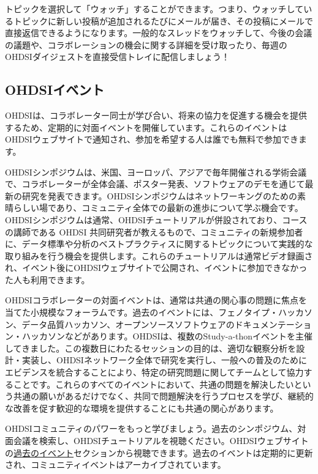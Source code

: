 \documentclass[
  11pt]{book}
\makeatletter
\newenvironment{kframe}{%
\medskip{}
\setlength{\fboxsep}{.8em}
 \def\at@end@of@kframe{}%
 \ifinner\ifhmode%
  \def\at@end@of@kframe{\end{minipage}}%
  \begin{minipage}{\columnwidth}%
 \fi\fi%
 \def\FrameCommand##1{\hskip\@totalleftmargin \hskip-\fboxsep
 \colorbox{myShadeColor}{##1}\hskip-\fboxsep
     \hskip-\linewidth \hskip-\@totalleftmargin \hskip\columnwidth}%
 \MakeFramed {\advance\hsize-\width
   \@totalleftmargin\z@ \linewidth\hsize
   \@setminipage}}%
 {\par\unskip\endMakeFramed%
 \at@end@of@kframe}
\newenvironment{rmdblock}[1]
  {
  \begin{itemize}
  \renewcommand{\labelitemi}{
    \raisebox{-.7\height}[0pt][0pt]{
      {\setkeys{Gin}{width=3em,keepaspectratio}\texttt{[image: images/\#1]}}
    }
  }
  \setlength{\fboxsep}{1em}
  \begin{kframe}
  \item
  }
  {
  \end{kframe}
  \end{itemize}
  }
\newenvironment{rmdimportant}
  {\begin{rmdblock}{important}}
  {\end{rmdblock}}
\theoremstyle{definition}
\theoremstyle{definition}
\theoremstyle{definition}
\theoremstyle{definition}
\theoremstyle{remark}
\makeatother
\begin{document}
\begin{rmdimportant}
トピックを選択して「ウォッチ」することができます。つまり、ウォッチしているトピックに新しい投稿が追加されるたびにメールが届き、その投稿にメールで直接返信できるようになります。一般的なスレッドをウォッチして、今後の会議の議題や、コラボレーションの機会に関する詳細を受け取ったり、毎週のOHDSIダイジェストを直接受信トレイに配信しましょう！
\end{rmdimportant}

\subsection{OHDSIイベント}\label{ohdsiux30a4ux30d9ux30f3ux30c8}

OHDSIは、コラボレーター同士が学び合い、将来の協力を促進する機会を提供するため、定期的に対面イベントを開催しています。これらのイベントはOHDSIウェブサイトで通知され、参加を希望する人は誰でも無料で参加できます。

OHDSIシンポジウムは、米国、ヨーロッパ、アジアで毎年開催される学術会議で、コラボレーターが全体会議、ポスター発表、ソフトウェアのデモを通じて最新の研究を発表できます。OHDSIシンポジウムはネットワーキングのための素晴らしい場であり、コミュニティ全体での最新の進歩について学ぶ機会です。OHDSIシンポジウムは通常、OHDSIチュートリアルが併設されており、コースの講師である OHDSI 共同研究者が教えるもので、コミュニティの新規参加者に、データ標準や分析のベストプラクティスに関するトピックについて実践的な取り組みを行う機会を提供します。これらのチュートリアルは通常ビデオ録画され、イベント後にOHDSIウェブサイトで公開され、イベントに参加できなかった人も利用できます。

OHDSIコラボレーターの対面イベントは、通常は共通の関心事の問題に焦点を当てた小規模なフォーラムです。過去のイベントには、フェノタイプ・ハッカソン、データ品質ハッカソン、オープンソースソフトウェアのドキュメンテーション・ハッカソンなどがあります。OHDSIは、複数のStudy-a-thonイベントを主催してきました。この複数日にわたるセッションの目的は、適切な観察分析を設計・実装し、OHDSIネットワーク全体で研究を実行し、一般への普及のためにエビデンスを統合することにより、特定の研究問題に関してチームとして協力することです。これらのすべてのイベントにおいて、共通の問題を解決したいという共通の願いがあるだけでなく、共同で問題解決を行うプロセスを学び、継続的な改善を促す歓迎的な環境を提供することにも共通の関心があります。

OHDSIコミュニティのパワーをもっと学びましょう。過去のシンポジウム、対面会議を検索し、OHDSIチュートリアルを視聴ください。OHDSIウェブサイトの\href{https://www.ohdsi.org/past-events/}{過去のイベント}セクションから視聴できます。過去のイベントは定期的に更新され、コミュニティイベントはアーカイブされています。
\end{document}
